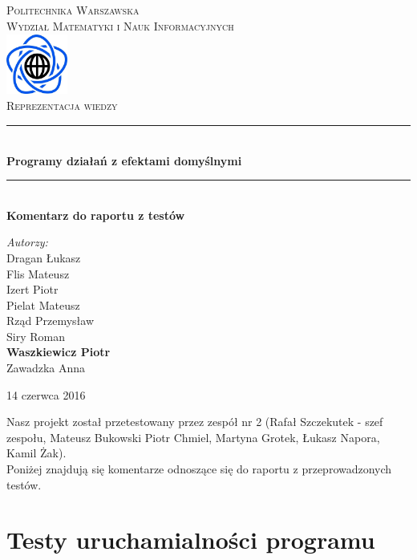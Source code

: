 \documentclass{article}
\begin{document}
\begin{titlepage}
\newcommand{\HRule}{\rule{\linewidth}{0.5mm}}
\newcommand{\Action}[1]{\textsc{#1}}
\center
\textsc{\LARGE Politechnika Warszawska}\\[0.3cm]
\textsc{\Large Wydział Matematyki i Nauk Informacyjnych}\\[0.6cm]
\includegraphics[width=2cm, height=2cm]{logo}\\[0.6cm]
\textsc{\Huge Reprezentacja wiedzy}\\[0.3cm]
\HRule \\[0.4cm]
{ \LARGE \bfseries Programy działań z efektami domyślnymi}\\[0.1cm]
 
\HRule \\[0.4cm]
{  \bfseries Komentarz do raportu z testów}\\[1.2cm]
\begin{flushright}
\Large \emph{Autorzy:}\\[0.5cm]
Dragan Łukasz\\
Flis Mateusz\\
Izert Piotr\\
Pielat Mateusz\\
Rząd Przemysław\\
Siry Roman\\
\textbf{Waszkiewicz Piotr}\\
Zawadzka Anna\\[0.9cm]
\end{flushright}
\vfill
{\large 14 czerwca 2016}\\[1cm]
\end{titlepage}
\newpage


Nasz projekt został przetestowany przez zespół nr 2 (Rafał Szczekutek - szef zespołu, Mateusz Bukowski  Piotr Chmiel, Martyna Grotek, Łukasz Napora, Kamil Żak). \\
Poniżej znajdują się komentarze odnoszące się do raportu z przeprowadzonych testów.
\section{Testy uruchamialności programu}
\end{document}
